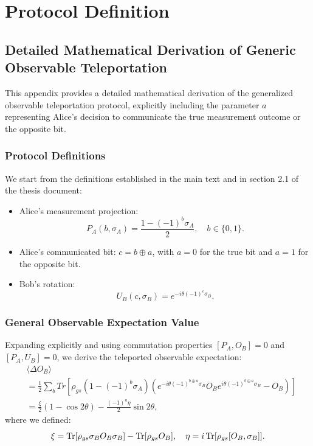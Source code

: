 \section{Protocol Definition}
\subsection{Detailed Mathematical Derivation of Generic Observable Teleportation}
\label{appendix:detailed-protocol-analysis}

This appendix provides a detailed mathematical derivation of the generalized observable teleportation protocol, explicitly including the parameter $a$ representing Alice’s decision to communicate the true measurement outcome or the opposite bit.

\subsubsection{Protocol Definitions}
We start from the definitions established in the main text and in section 2.1 of the thesis document:
\begin{itemize}
\item Alice's measurement projection: 
\begin{equation}
P_A(b,\sigma_A)=\frac{1-(-1)^b\sigma_A}{2},\quad b\in\{0,1\}.
\end{equation}
\item Alice’s communicated bit: $c=b\oplus a$, with $a=0$ for the true bit and $a=1$ for the opposite bit.
\item Bob’s rotation:
\begin{equation}
U_B(c,\sigma_B)=e^{-i\theta(-1)^c\sigma_B}.
\end{equation}
\end{itemize}

\subsubsection{General Observable Expectation Value}

Expanding explicitly and using commutation properties $[P_A,O_B]=0$ and $[P_A,U_B]=0$, we derive the teleported observable expectation:
\begin{align}
&\langle\Delta O_B\rangle \nonumber\\
&= \frac{1}{2}\sum_bTr\left[\rho_{gs}(1-(-1)^b\sigma_A)(e^{-i\theta(-1)^{b\oplus a}\sigma_B}O_B e^{i\theta(-1)^{b\oplus a}\sigma_B}-O_B)\right] \nonumber\\
&=\frac{\xi}{2}(1-\cos 2\theta)-\frac{(-1)^a\eta}{2}\sin 2\theta,
\end{align}
where we defined:
\begin{equation}
\xi=\Tr[\rho_{gs}\sigma_B O_B\sigma_B]-\Tr[\rho_{gs}O_B],\quad\eta=i\Tr[\rho_{gs}[O_B,\sigma_B]].
\end{equation}

